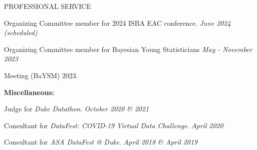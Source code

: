 \documentclass{resume} %
\begin{document}
\begin{rSection}{PROFESSIONAL SERVICE}
 
\smallskip 
 
	
Organizing Committee member for 2024 ISBA EAC conference. 	\hfill {\em June 2024 (scheduled)}
	
\smallskip
	
Organizing Committee member for Bayesian Young Statisticians  \hfill {\em May - November 2023}

\vspace{-0.1in}
Meeting (BaYSM) 2023.


 \hspace*{-0.2in}\textbf{Miscellaneous: }

Judge for \emph{Duke Datathon}.  \hfill {\em October 2020 \& 2021}







\smallskip

Consultant for \emph{DataFest: COVID-19 Virtual Data Challenge}.  \hfill {\em April 2020}



\smallskip

Consultant for \emph{ASA DataFest @ Duke}. \hfill {\em April 2018 \& April 2019}
\end{rSection}
\end{document}
